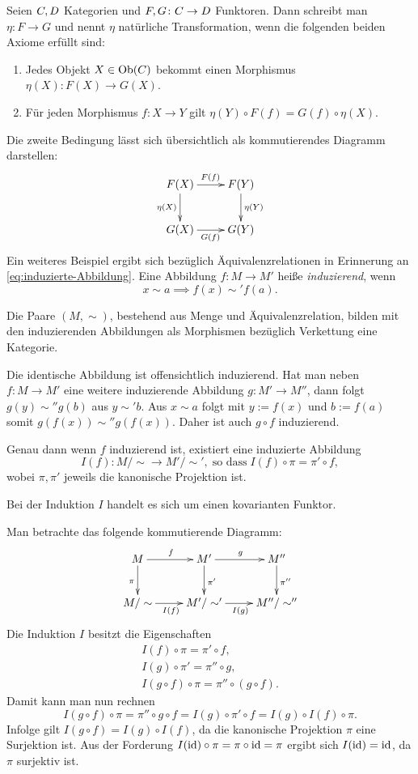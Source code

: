 \begin{Definition}
Seien $C, D$ Kategorien und
$F,G\colon C\to D$ Funktoren.
Dann schreibt man $\eta\colon F\to G$ und nennt $\eta$ natürliche
Transformation, wenn die folgenden beiden Axiome erfüllt sind:
\begin{enumerate}
\item Jedes Objekt $X\in\operatorname{Ob}(C)$ bekommt einen Morphismus
$\eta(X)\colon F(X)\to G(X)$.
\item Für jeden Morphismus $f\colon X\to Y$ gilt
$\eta(Y)\circ F(f)=G(f)\circ\eta(X)$.
\end{enumerate}
\end{Definition}
Die zweite Bedingung lässt sich übersichtlich als kommutierendes Diagramm
darstellen:
\[\xymatrix{
F(X) \ar[r]^{F(f)} \ar[d]_{\eta(X)} & F(Y) \ar[d]^{\eta(Y)} \\
G(X) \ar[r]_{G(f)} & G(Y)}\]
Ein weiteres Beispiel ergibt sich bezüglich Äquivalenzrelationen
in Erinnerung an \eqref{eq:induzierte-Abbildung}.
Eine Abbildung $f\colon M\to M'$ heiße \emph{induzierend}, wenn%
\[x\sim a \implies f(x)\sim' f(a).\]
\begin{Satz}
Die Paare $(M,\sim)$, bestehend aus Menge und Äquivalenzrelation,
bilden mit den induzierenden Abbildungen
als Morphismen bezüglich Verkettung eine Kategorie.
\end{Satz}
Die identische Abbildung ist offensichtlich induzierend. Hat man
neben $f\colon M\to M'$ eine weitere induzierende Abbildung $g\colon M'\to M''$, dann
folgt $g(y)\sim'' g(b)$ aus $y\sim' b$. Aus $x\sim a$ folgt
mit $y:=f(x)$ und $b:=f(a)$ somit $g(f(x))\sim'' g(f(x))$.
Daher ist auch $g\circ f$ induzierend.\;\qedsymbol

Genau dann wenn $f$ induzierend ist, existiert eine induzierte
Abbildung
\[I(f)\colon M/\sim\to M'/\sim',\;\text{so dass}\;I(f)\circ\pi = \pi'\circ f,\]
wobei $\pi,\pi'$ jeweils die kanonische Projektion ist.
\begin{Satz}
Bei der Induktion $I$ handelt es sich um einen kovarianten Funktor.
\end{Satz}
 Man betrachte das folgende kommutierende Diagramm:
\[\xymatrix{
M \ar[r]^{f} \ar[d]_{\pi}
& M' \ar[r]^{g} \ar[d]^{\pi'}
& M'' \ar[d]^{\pi''}\\
M/\sim \ar[r]_{I(f)}
& M'/\sim' \ar[r]_{I(g)}
& M''/\sim''}\]
Die Induktion $I$ besitzt die Eigenschaften
\begin{gather*}
I(f)\circ\pi = \pi'\circ f,\\
I(g)\circ\pi' = \pi''\circ g,\\
I(g\circ f)\circ\pi = \pi''\circ (g\circ f).
\end{gather*}
Damit kann man nun rechnen
\begin{equation}
I(g\circ f)\circ\pi = \pi''\circ g\circ f
= I(g)\circ\pi'\circ f = I(g)\circ I(f)\circ\pi.
\end{equation}
Infolge gilt $I(g\circ f)=I(g)\circ I(f)$, da die kanonische
Projektion $\pi$ eine Surjektion ist. Aus der Forderung $I(\operatorname{id})\circ\pi
= \pi\circ\operatorname{id} = \pi$ ergibt sich $I(\operatorname{id}) = \operatorname{id}$,
da $\pi$ surjektiv ist.\;\qedsymbol

